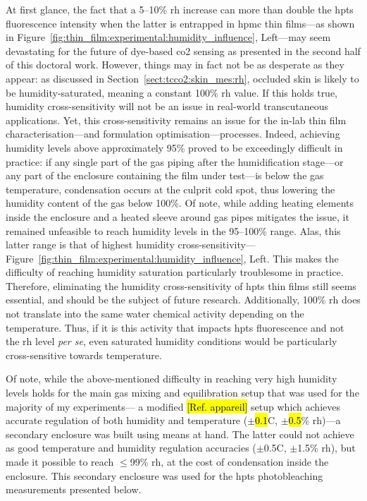 At first glance, the fact that a 5--10\% \gls{rh} increase can more than double the \gls{hpts} fluorescence intensity when the latter is entrapped in \gls{hpmc} thin films---as shown in Figure~\ref{fig:thin_film:experimental:humidity_influence}, Left---may seem devastating for the future of dye-based \gls{co2} sensing as presented in the second half of this doctoral work. However, things may in fact not be as desperate as they appear: as discussed in Section~\ref{sect:tcco2:skin_mes:rh}, occluded skin is likely to be humidity-saturated, meaning a constant 100\% \gls{rh} value. If this holds true, humidity cross-sensitivity will not be an issue in real-world transcutaneous applications. Yet, this cross-sensitivity remains an issue for the in-lab thin film characterisation---and formulation optimisation---processes. Indeed, achieving humidity levels above approximately 95\% proved to be exceedingly difficult in practice: if any single part of the gas piping after the humidification stage---or any part of the enclosure containing the film under test---is below the gas temperature, condensation occurs at the culprit cold spot, thus lowering the humidity content of the gas below 100\%. Of note, while adding heating elements inside the enclosure and a heated sleeve around gas pipes mitigates the issue, it remained unfeasible to reach humidity levels in the 95--100\% range. Alas, this latter range is that of highest humidity cross-sensitivity---Figure~\ref{fig:thin_film:experimental:humidity_influence}, Left. This makes the difficulty of reaching humidity saturation particularly troublesome in practice. \mfrin{}Therefore, eliminating the humidity cross-sensitivity of \gls{hpts} thin films still seems essential, and should be the subject of future research. Additionally, 100\% \gls{rh} does not translate into the same water chemical activity depending on the temperature\cite{huang2018}. Thus, if it is this activity that impacts \gls{hpts} fluorescence and not the \gls{rh} level \textit{per se}, even saturated humidity conditions would be particularly cross-sensitive towards temperature.

Of note, while the above-mentioned difficulty in reaching very high humidity levels holds for the main gas mixing and equilibration setup that was used for the majority of my experiments---\ie{} a modified \hl{[Ref. appareil]} setup which achieves accurate regulation of both humidity and temperature ($\pm$\hl{0.1}{\degree}C, $\pm$\hl{0.5}\% \gls{rh})---a secondary enclosure was built using means at hand. The latter could not achieve as good temperature and humidity regulation accuracies ($\pm$0.5{\degree}C, $\pm$1.5\% \gls{rh}), but made it possible to reach $\leq$99\% \gls{rh}, at the cost of condensation inside the enclosure. This secondary enclosure was used for the \gls{hpts} photobleaching measurements presented below.


